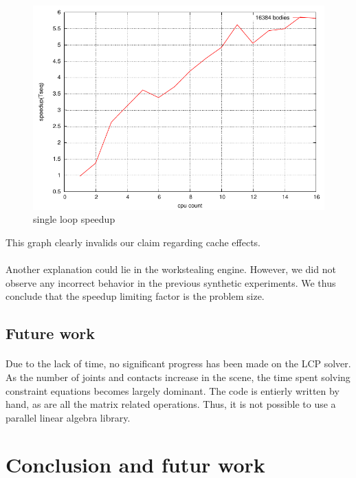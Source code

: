 \documentclass[a4paper, 11pt]{article}
\begin{document}
\begin{figure}[!hb]
\centering
\includegraphics[keepaspectratio=true, width=\linewidth]{../graphs/opende_merged_speedups.pdf}
\caption{single loop speedup}
\label{opende_merged_speedups}
\end{figure}
This graph clearly invalids our claim regarding cache effects.

\paragraph{}
Another explanation could lie in the workstealing engine. However, we did not observe any
incorrect behavior in the previous synthetic experiments. We thus conclude that the speedup
limiting factor is the problem size.

\subsection{Future work}
\paragraph{}
Due to the lack of time, no significant progress has been made on the LCP solver. As
the number of joints and contacts increase in the scene, the time spent solving constraint
equations becomes largely dominant. The code is entierly written by hand, as are all the
matrix related operations. Thus, it is not possible to use a parallel linear algebra library.

\newpage
\section{Conclusion and futur work}
\end{document}

